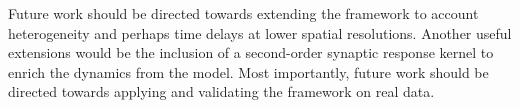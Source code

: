 \documentclass[journal,a4paper]{IEEEtran}
\begin{document}
Future work should be directed towards extending the framework to account heterogeneity and perhaps time delays at lower spatial resolutions. Another useful extensions would be the inclusion of a second-order synaptic response kernel to enrich the dynamics from the model. Most importantly, future work should be directed towards applying and validating the framework on real data.





\ifCLASSOPTIONcaptionsoff
  \newpage
\fi

%  
% 


 
\end{document}
